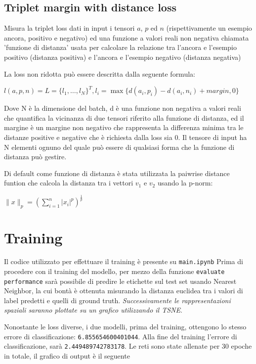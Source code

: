 \documentclass[11pt]{article}
\begin{document}
\subsection{Triplet margin with distance loss}
Misura la triplet loss dati in input i tensori $a$, $p$ ed $n$ (rispettivamente un esempio ancora, positivo e negativo) ed una funzione a valori
reali non negativa chiamata 'funzione di distanza' usata per calcolare la relazione tra l'ancora e l'esempio positivo (distanza positiva) e l'ancora e l'esempio negativo (distanza negativa)

La loss non ridotta può essere descritta dalla seguente formula:

\begin{center}
    $l(a,p,n) = L = { \{ l_1, \ldots, l_N \}}^T, l_i = \max{\{ d(a_i, p_i) - d(a_i, n_i) + margin, 0 \}} $
\end{center}

Dove N è la dimensione del batch, d è una funzione non negativa a valori reali che quantifica la vicinanza di due tensori riferito alla funzione di distanza,
ed il margine è un margine non negativo che rappresenta la differenza minima tra le distanze positive e negative che è richiesta dalla loss sia 0.
Il tensore di input ha N elementi ognuno del quale può essere di qualsiasi forma che la funzione di distanza può gestire.

Di default come funzione di distanza è stata utilizzata la paiwrise distance funtion che calcola la distanza tra i vettori $v_1$ e $v_2$ usando la p-norm:

\begin{center}
    $ \| x \| _p = ( \sum^n_{i=1} |x_i|^p )^{\frac{1}{p}} $
\end{center}

\section{Training}

Il codice utilizzato per effettuare il training è presente su \texttt{main.ipynb}
Prima di procedere con il training del modello, per mezzo della funzione \texttt{evaluate performance} sarà possibile di predire le etichette sul test set usando Nearest Neighbor, la cui bontà è ottenuta misurando la distanza euclidea tra i valori di label predetti e quelli di ground truth. \textit{Successivamente le rappresentazioni spaziali saranno plottate su un grafico utilizzando il TSNE}.

Nonostante le loss diverse, i due modelli, prima del training, ottengono lo stesso errore di classificazione: \texttt{6.855654600401044}. 
Alla fine del training l'errore di classificazione, sarà \texttt{2.449489742783178}. Le reti sono state allenate per 30 epoche in totale, il grafico di output è il seguente
\end{document}
